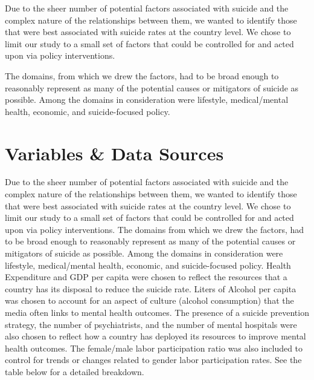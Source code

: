 \documentclass[]{article}
\begin{document}
Due to the sheer number of potential factors associated with suicide and
the complex nature of the relationships between them, we wanted to
identify those that were best associated with suicide rates at the
country level. We chose to limit our study to a small set of factors
that could be controlled for and acted upon via policy interventions.

The domains, from which we drew the factors, had to be broad enough to
reasonably represent as many of the potential causes or mitigators of
suicide as possible. Among the domains in consideration were lifestyle,
medical/mental health, economic, and suicide-focused policy.

\section{Variables \& Data Sources}\label{variables-data-sources}

Due to the sheer number of potential factors associated with suicide and
the complex nature of the relationships between them, we wanted to
identify those that were best associated with suicide rates at the
country level. We chose to limit our study to a small set of factors
that could be controlled for and acted upon via policy interventions.
The domains from which we drew the factors, had to be broad enough to
reasonably represent as many of the potential causes or mitigators of
suicide as possible. Among the domains in consideration were lifestyle,
medical/mental health, economic, and suicide-focused policy. Health
Expenditure and GDP per capita were chosen to reflect the resources that
a country has its disposal to reduce the suicide rate. Liters of Alcohol
per capita was chosen to account for an aspect of culture (alcohol
consumption) that the media often links to mental health outcomes. The
presence of a suicide prevention strategy, the number of psychiatrists,
and the number of mental hospitals were also chosen to reflect how a
country has deployed its resources to improve mental health outcomes.
The female/male labor participation ratio was also included to control
for trends or changes related to gender labor participation rates. See
the table below for a detailed breakdown.
\end{document}
